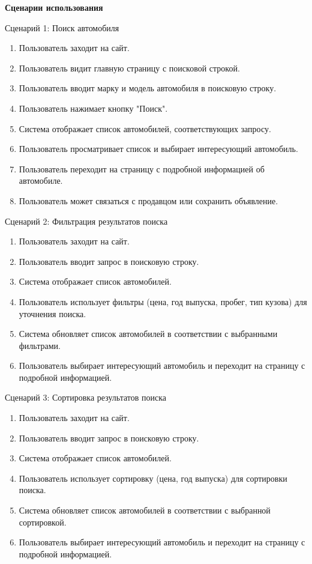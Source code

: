 \textbf{Сценарии использования}

Сценарий 1: Поиск автомобиля

\begin{enumerate}
    \item Пользователь заходит на сайт.
    \item Пользователь видит главную страницу с поисковой строкой.
    \item Пользователь вводит марку и модель автомобиля в поисковую строку.
    \item Пользователь нажимает кнопку "Поиск".
    \item Система отображает список автомобилей, соответствующих запросу.
    \item Пользователь просматривает список и выбирает интересующий автомобиль.
    \item Пользователь переходит на страницу с подробной информацией об автомобиле.
    \item Пользователь может связаться с продавцом или сохранить объявление.
\end{enumerate}
\bigskip

Сценарий 2: Фильтрация результатов поиска

\begin{enumerate}
    \item Пользователь заходит на сайт.
    \item Пользователь вводит запрос в поисковую строку.
    \item Система отображает список автомобилей.
    \item Пользователь использует фильтры (цена, год выпуска, пробег, тип кузова) для уточнения поиска.
    \item Система обновляет список автомобилей в соответствии с выбранными фильтрами.
    \item Пользователь выбирает интересующий автомобиль и переходит на страницу с подробной информацией.
\end{enumerate}
\bigskip

Сценарий 3: Сортировка результатов поиска

\begin{enumerate}
    \item Пользователь заходит на сайт.
    \item Пользователь вводит запрос в поисковую строку.
    \item Система отображает список автомобилей.
    \item Пользователь использует сортировку (цена, год выпуска) для сортировки поиска.
    \item Система обновляет список автомобилей в соответствии с выбранной сортировкой.
    \item Пользователь выбирает интересующий автомобиль и переходит на страницу с подробной информацией.
\end{enumerate}
\bigskip

